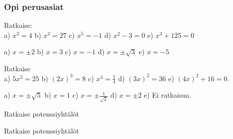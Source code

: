 \begin{tehtavasivu}
\subsubsection*{Opi perusasiat}
\begin{tehtava}
Ratkaise: \\
a) $ x^2 = 4 $ \qquad
b) $ x^3 = 27 $ \qquad
c) $ x^5 = -1 $ \qquad
d) $ x^2 - 3 = 0 $ \qquad
e) $ x^3 + 125 = 0 $
\begin{vastaus}
a) $ x = \pm 2 $ \qquad
b) $ x = 3 $ \qquad
c) $ x = -1 $ \qquad
d) $ x = \pm\sqrt{3} $ \qquad
e) $ x = -5 $ 
\end{vastaus}
\end{tehtava}

\begin{tehtava}
Ratkaise \\
a) $ 5x^2 = 25 $ \qquad
b) $ (2x)^3 = 8 $ \qquad
c) $ x^4 = \frac{1}{4} $ \qquad
d) $ (3x)^2 = 36 $ \qquad
e) $ (4x)^2 + 16 = 0 $.
\begin{vastaus}
a) $ x = \pm\sqrt{5} $ \qquad
b) $ x = 1 $ \qquad
c) $ x = \pm\frac{1}{\sqrt{2}} $ \qquad
d) $ x = \pm 2 $ \qquad
e) Ei ratkaisua. 
\end{vastaus}
\end{tehtava}

\begin{tehtava}
Ratkaise potenssiyhtälöt
\begin{alakohdat}
\end{alakohdat}
\begin{vastaus}
\begin{alakohdat}
\end{alakohdat}
\end{vastaus}
\end{tehtava}

\begin{tehtava}
Ratkaise potenssiyhtälöt
\begin{alakohdat}
\end{alakohdat}
\begin{vastaus}
\begin{alakohdat}
\end{alakohdat}
\end{vastaus}
\end{tehtava}


\end{tehtavasivu}
